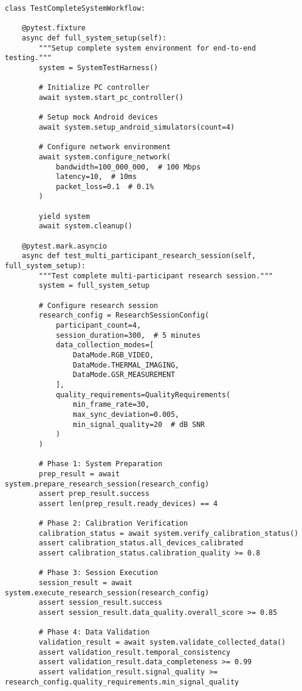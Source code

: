 \documentclass[11pt,a4paper]{report}
\begin{document}
\begin{verbatim}
class TestCompleteSystemWorkflow:

    @pytest.fixture
    async def full_system_setup(self):
        """Setup complete system environment for end-to-end testing."""
        system = SystemTestHarness()

        # Initialize PC controller
        await system.start_pc_controller()

        # Setup mock Android devices
        await system.setup_android_simulators(count=4)

        # Configure network environment
        await system.configure_network(
            bandwidth=100_000_000,  # 100 Mbps
            latency=10,  # 10ms
            packet_loss=0.1  # 0.1%
        )

        yield system
        await system.cleanup()

    @pytest.mark.asyncio
    async def test_multi_participant_research_session(self, full_system_setup):
        """Test complete multi-participant research session."""
        system = full_system_setup

        # Configure research session
        research_config = ResearchSessionConfig(
            participant_count=4,
            session_duration=300,  # 5 minutes
            data_collection_modes=[
                DataMode.RGB_VIDEO,
                DataMode.THERMAL_IMAGING,
                DataMode.GSR_MEASUREMENT
            ],
            quality_requirements=QualityRequirements(
                min_frame_rate=30,
                max_sync_deviation=0.005,
                min_signal_quality=20  # dB SNR
            )
        )

        # Phase 1: System Preparation
        prep_result = await system.prepare_research_session(research_config)
        assert prep_result.success
        assert len(prep_result.ready_devices) == 4

        # Phase 2: Calibration Verification
        calibration_status = await system.verify_calibration_status()
        assert calibration_status.all_devices_calibrated
        assert calibration_status.calibration_quality >= 0.8

        # Phase 3: Session Execution
        session_result = await system.execute_research_session(research_config)
        assert session_result.success
        assert session_result.data_quality.overall_score >= 0.85

        # Phase 4: Data Validation
        validation_result = await system.validate_collected_data()
        assert validation_result.temporal_consistency
        assert validation_result.data_completeness >= 0.99
        assert validation_result.signal_quality >= research_config.quality_requirements.min_signal_quality


\end{verbatim}
\end{document}
